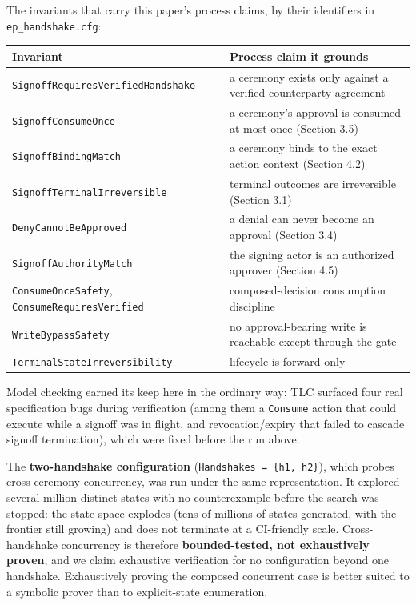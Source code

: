 \documentclass[
  11pt,
]{article}
\begin{document}
The invariants that carry this paper's process claims, by their
identifiers in \texttt{ep\_handshake.cfg}:

\begin{longtable}[]{@{}
  >{\raggedright\arraybackslash}p{}
  >{\raggedright\arraybackslash}p{}@{}}
\toprule\noalign{}
\begin{minipage}[b]{\linewidth}\raggedright
Invariant
\end{minipage} & \begin{minipage}[b]{\linewidth}\raggedright
Process claim it grounds
\end{minipage} \\
\midrule\noalign{}
\endhead
\bottomrule\noalign{}
\endlastfoot
\texttt{SignoffRequiresVerifiedHandshake} & a ceremony exists only
against a verified counterparty agreement \\
\texttt{SignoffConsumeOnce} & a ceremony's approval is consumed at most
once (Section 3.5) \\
\texttt{SignoffBindingMatch} & a ceremony binds to the exact action
context (Section 4.2) \\
\texttt{SignoffTerminalIrreversible} & terminal outcomes are
irreversible (Section 3.1) \\
\texttt{DenyCannotBeApproved} & a denial can never become an approval
(Section 3.4) \\
\texttt{SignoffAuthorityMatch} & the signing actor is an authorized
approver (Section 4.5) \\
\texttt{ConsumeOnceSafety}, \texttt{ConsumeRequiresVerified} &
composed-decision consumption discipline \\
\texttt{WriteBypassSafety} & no approval-bearing write is reachable
except through the gate \\
\texttt{TerminalStateIrreversibility} & lifecycle is forward-only \\
\end{longtable}

Model checking earned its keep here in the ordinary way: TLC surfaced
four real specification bugs during verification (among them a
\texttt{Consume} action that could execute while a signoff was in
flight, and revocation/expiry that failed to cascade signoff
termination), which were fixed before the run above.

The \textbf{two-handshake configuration}
(\texttt{Handshakes\ =\ \{h1,\ h2\}}), which probes cross-ceremony
concurrency, was run under the same representation. It explored several
million distinct states with no counterexample before the search was
stopped: the state space explodes (tens of millions of states generated,
with the frontier still growing) and does not terminate at a CI-friendly
scale. Cross-handshake concurrency is therefore \textbf{bounded-tested,
not exhaustively proven}, and we claim exhaustive verification for no
configuration beyond one handshake. Exhaustively proving the composed
concurrent case is better suited to a symbolic prover than to
explicit-state enumeration.
\end{document}
